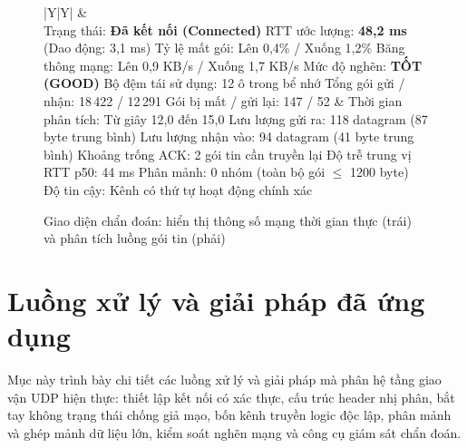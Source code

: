 \begin{figure}[H]
\centering
\begin{center}\small
\begin{tabularx}{\linewidth}{|Y|Y|}
\hline
{} &  \\ \hline
Trạng thái: \textbf{Đã kết nối (Connected)} \newline
RTT ước lượng: \textbf{48,2 ms} (Dao động: 3,1 ms) \newline
Tỷ lệ mất gói: Lên 0,4\% / Xuống 1,2\% \newline
Băng thông mạng: Lên 0,9 KB/s / Xuống 1,7 KB/s \newline
Mức độ nghẽn: \textbf{TỐT (GOOD)} \newline
Bộ đệm tái sử dụng: 12 ô trong bể nhớ \newline
Tổng gói gửi / nhận: 18\,422 / 12\,291 \newline
Gói bị mất / gửi lại: 147 / 52 &
Thời gian phân tích: Từ giây 12,0 đến 15,0 \newline
Lưu lượng gửi ra: 118 datagram (87 byte trung bình) \newline
Lưu lượng nhận vào: 94 datagram (41 byte trung bình) \newline
Khoảng trống ACK: 2 gói tin cần truyền lại \newline
Độ trễ trung vị RTT p50: 44 ms \newline
Phân mảnh: 0 nhóm (toàn bộ gói $\le$ 1200 byte) \newline
Độ tin cậy: Kênh có thứ tự hoạt động chính xác \\ \hline
\end{tabularx}
\end{center}
\caption{Giao diện chẩn đoán: hiển thị thông số mạng thời gian thực (trái) và phân tích luồng gói tin (phải)}
\label{fig:B-chandoan}
\end{figure}

\section{Luồng xử lý và giải pháp đã ứng dụng}
Mục này trình bày chi tiết các luồng xử lý và giải pháp mà phân hệ tầng giao vận UDP hiện thực: thiết lập kết nối có xác thực, cấu trúc header nhị phân, bắt tay không trạng thái chống giả mạo, bốn kênh truyền logic độc lập, phân mảnh và ghép mảnh dữ liệu lớn, kiểm soát nghẽn mạng và công cụ giám sát chẩn đoán.

